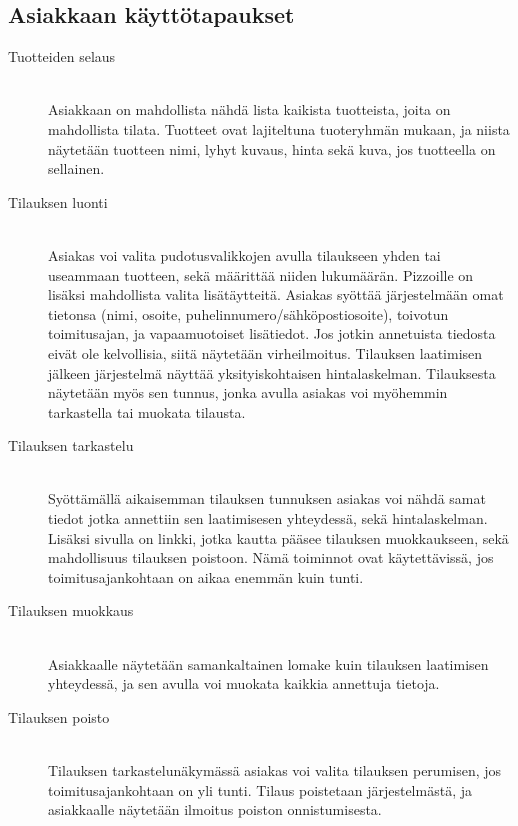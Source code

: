 \documentclass[a4paper, 12pt, finnish]{article}
\begin{document}
\subsection*{Asiakkaan käyttötapaukset}
\begin{description}
\item[Tuotteiden selaus]\mbox{}\\
Asiakkaan on mahdollista nähdä lista kaikista tuotteista, joita on mahdollista tilata. Tuotteet ovat lajiteltuna tuoteryhmän mukaan, ja niista näytetään tuotteen nimi, lyhyt kuvaus, hinta sekä kuva, jos tuotteella on sellainen.
\item[Tilauksen luonti]\mbox{}\\
Asiakas voi valita pudotusvalikkojen avulla tilaukseen yhden tai useammaan tuotteen, sekä määrittää niiden lukumäärän. Pizzoille on lisäksi mahdollista valita lisätäytteitä. Asiakas syöttää järjestelmään omat tietonsa (nimi, osoite, puhelinnumero/sähköpostiosoite), toivotun toimitusajan, ja vapaamuotoiset lisätiedot. Jos jotkin annetuista tiedosta eivät ole kelvollisia, siitä näytetään virheilmoitus. Tilauksen laatimisen jälkeen järjestelmä näyttää yksityiskohtaisen hintalaskelman. Tilauksesta näytetään myös sen tunnus, jonka avulla asiakas voi myöhemmin tarkastella tai muokata tilausta.
\item[Tilauksen tarkastelu]\mbox{}\\
Syöttämällä aikaisemman tilauksen tunnuksen asiakas voi nähdä samat tiedot jotka annettiin sen laatimisesen yhteydessä, sekä hintalaskelman. Lisäksi sivulla on linkki, jotka kautta pääsee tilauksen muokkaukseen, sekä mahdollisuus tilauksen poistoon. Nämä toiminnot ovat käytettävissä, jos toimitusajankohtaan on aikaa enemmän kuin tunti.
\item[Tilauksen muokkaus]\mbox{}\\
Asiakkaalle näytetään samankaltainen lomake kuin tilauksen laatimisen yhteydessä, ja sen avulla voi muokata kaikkia annettuja tietoja.
\item[Tilauksen poisto]\mbox{}\\
Tilauksen tarkastelunäkymässä asiakas voi valita tilauksen perumisen, jos toimitusajankohtaan on yli tunti. Tilaus poistetaan järjestelmästä, ja asiakkaalle näytetään ilmoitus poiston onnistumisesta.
\end{description}
\end{document}

